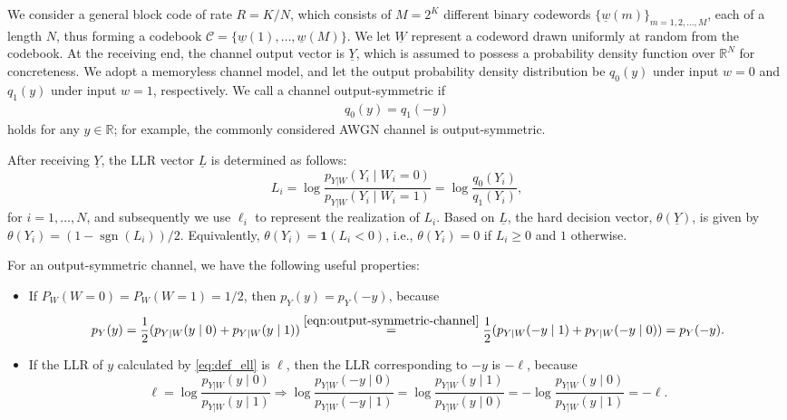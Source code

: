 \documentclass[letterpaper,draftclsnofoot,onecolumn]{IEEEtran}
\begin{document}
We consider a general block code of rate $R = K/N$, which consists of $M = 2^K$ different binary codewords $\{\underline{w}(m)\}_{m = 1, 2, \ldots, M}$, each of a length $N$, thus forming a codebook $\mathcal{C} = \{\underline{w}(1),\ldots,\underline{w}(M)\}$. We let $\underline{W}$ represent a codeword drawn uniformly at random from the codebook. At the receiving end, the channel output vector is $\underline{Y}$, which is assumed to possess a probability density function over $\mathbb{R}^N$ for concreteness. We adopt a memoryless channel model, and let the output probability density distribution be $q_0(y)$ under input $w = 0$ and $q_1(y)$ under input $w = 1$, respectively. We call a channel output-symmetric if
\begin{eqnarray}\label{eqn:output-symmetric-channel}
    q_0(y) = q_1(-y)
\end{eqnarray}
holds for any $y \in \mathbb{R}$; for example, the commonly considered AWGN channel is output-symmetric. 

After receiving $\underline{Y}$, the LLR vector $\underline{L}$ is determined as follows:
\begin{equation}\label{eq:def_ell}
    L_i = {\log\frac{p_{Y|W}(Y_i \mid W_i = 0)}{p_{Y|W}(Y_i \mid W_i = 1)}} = \log\frac{q_0(Y_i)}{q_1(Y_i)},
\end{equation}
for $i = 1, \ldots, N$, and subsequently we use $\ell_{i}$ to represent the realization of $L_i$. Based on $\underline{L}$, the hard decision vector, $\theta(\underline{Y})$, is given by $\theta(Y_i) = (1 - \operatorname{sgn}(L_i))/2$. Equivalently, $\theta(Y_i)=\mathbf{1}(L_i < 0)$, i.e., $\theta(Y_i)=0$ if $L_i\ge 0$ and $1$ otherwise.

For an output-symmetric channel, we have the following useful properties:
\begin{itemize}
    \item If $P_W(W=0) = P_W(W=1) = 1/2$, then $p_Y(y) = p_Y(-y)$, because 
    \begin{equation}\label{eqn:prop_symm_1}
        p_Y(y) = \frac{1}{2}(p_{Y|W}(y \mid 0) + p_{Y|W}(y \mid 1)) \overset{\eqref{eqn:output-symmetric-channel}}{=} \frac{1}{2}(p_{Y|W}(-y \mid 1) + p_{Y|W}(-y \mid 0)) = p_Y(-y). 
    \end{equation}
    \item If the LLR of $y$ calculated by \eqref{eq:def_ell} is $\ell$, then the LLR corresponding to $-y$ is $-\ell$, because
    \begin{equation}\label{eqn:prop_symm_2}
        \ell = \log\frac{p_{Y|W}(y \mid 0)}{p_{Y|W}(y \mid 1)} \Rightarrow \log\frac{p_{Y|W}(-y \mid 0)}{p_{Y|W}(-y \mid 1)} = \log\frac{p_{Y|W}(y \mid 1)}{p_{Y|W}(y \mid 0)} = -\log\frac{p_{Y|W}(y \mid 0)}{p_{Y|W}(y \mid 1)} = -\ell. 
    \end{equation}
\end{itemize}
\end{document}
